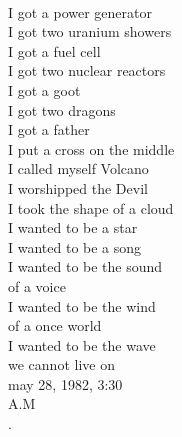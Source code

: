 \documentclass[smalldemyvopaper,11pt,twoside,onecolumn,openright,extrafontsizes]{memoir}
\begin{document}
\\I got a power generator
\\I got two uranium showers
\\I got a fuel cell
\\I got two nuclear reactors
\\I got a goot
\\I got two dragons
\\I got a father
\\I put a cross on the middle
\\I called myself Volcano
\\I worshipped the Devil
\\I took the shape of a cloud
\\I wanted to be a star
\\I wanted to be a song
\\I wanted to be the sound
\\of a voice
\\I wanted to be the wind
\\of a once world
\\I wanted to be the wave
\\we cannot live on
\\may 28, 1982, 3:30
\\A.M
\\.
\end{document}

